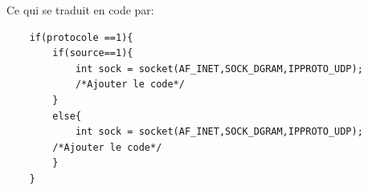 \documentclass[A4paper,11pt]{report}
\begin{document}
Ce qui se traduit en code par:

\begin{lstlisting}
    if(protocole ==1){
		if(source==1){
			int sock = socket(AF_INET,SOCK_DGRAM,IPPROTO_UDP);
            /*Ajouter le code*/
		}	
        else{
			int sock = socket(AF_INET,SOCK_DGRAM,IPPROTO_UDP);
        /*Ajouter le code*/
		}
	}
\end{lstlisting}
\end{document}
